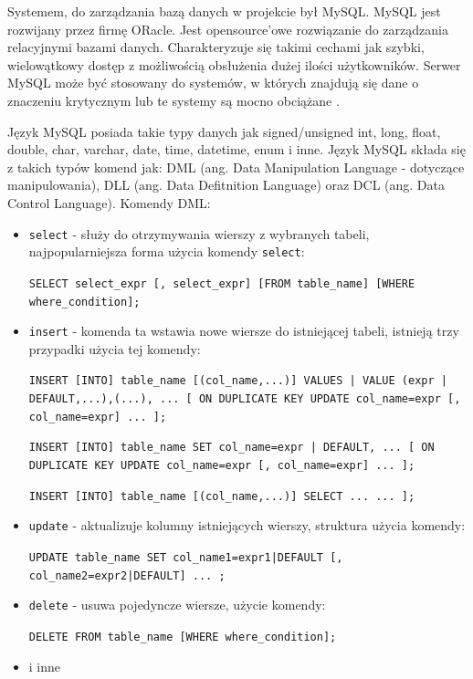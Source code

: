 \documentclass[eng,printmode,oneside]{mgr}
\begin{document}
Systemem, do zarządzania bazą danych w projekcie był MySQL. MySQL jest
rozwijany przez firmę ORacle. Jest opensource'owe rozwiązanie do zarządzania
relacyjnymi bazami danych. Charakteryzuje się takimi cechami jak szybki,
wielowątkowy dostęp z możliwością obsłużenia dużej ilości użytkowników. Serwer
MySQL może być stosowany do systemów, w których znajdują się dane o znaczeniu
krytycznym lub te systemy są mocno obciążane \cite{Mysql.com}. 

Język MySQL posiada takie typy danych jak signed/unsigned int, long, float,
double, char, varchar, date, time, datetime, enum i inne. Język MySQL składa się
z takich typów komend jak: DML (ang.
Data Manipulation Language - dotyczące manipulowania), DLL (ang. Data
Defitnition Language) oraz DCL (ang. Data Control Language).
Komendy DML:
\begin{itemize}
  \item \texttt{select} - służy do otrzymywania wierszy z wybranych tabeli,
  najpopularniejsza forma użycia komendy \texttt{select}:
    
  \texttt{SELECT select\_expr [, select\_expr] [FROM table\_name] [WHERE
  where\_condition];}
  
  \item \texttt{insert} - komenda ta wstawia nowe wiersze do istniejącej tabeli,
  istnieją trzy przypadki użycia tej komendy:
  
  \texttt{INSERT [INTO] table\_name [(col\_name,...)]
    {VALUES | VALUE} ({expr | DEFAULT},...),\newline (...), ...
    [ ON DUPLICATE KEY UPDATE
      col\_name=expr
        [, col\_name=expr] ... ];} 
  
  \texttt{INSERT [INTO] table\_name SET col\_name={expr | DEFAULT}, ... [ ON
  DUPLICATE KEY \newline UPDATE col\_name=expr [, col\_name=expr] ... ];}
      
   \texttt{INSERT [INTO] table\_name [(col\_name,...)]
    SELECT ... \newline[ ON DUPLICATE KEY UPDATE
      col\_name=expr
        [, col\_name=expr] ... ];}
  
  \item \texttt{update} - aktualizuje kolumny istniejących wierszy,
  struktura użycia komendy:
  
  \texttt{UPDATE table\_name
    SET col\_name1={expr1|DEFAULT} [, col\_name2={expr2|DEFAULT}] ...
    ;}
  
  \item \texttt{delete} - usuwa pojedyncze wiersze, użycie komendy:
  
  \texttt{DELETE FROM table\_name [WHERE where\_condition];}
  
  \item i inne
\end{itemize}
\end{document}
